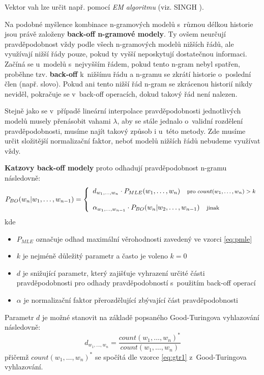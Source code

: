 \documentclass[12pt,a4paper]{report}
\begin{document}
Vektor vah lze určit např. pomocí \textit{EM algoritmu} (viz. SINGH \cite{emal}).

Na podobné myšlence kombinace n-gramových modelů s~různou délkou historie jsou právě založeny \textbf{back-off n-gramové modely}. Ty ovšem neurčují pravděpodobnost vždy podle všech n-gramových modelů nižších řádů, ale využívají nižší řády pouze, pokud ty vyšší neposkytují dostatečnou informaci. Začíná se u~modelů s~nejvyšším řádem, pokud tento n-gram nebyl spatřen, proběhne tzv. \textbf{back-off} k~nižšímu řádu a n-gramu se zkrátí historie o~poslední člen (např. slovo). Pokud ani tento nižší řád n-gram se zkrácenou historií nikdy neviděl, pokračuje se v~back-off operacích, dokud takový řád není nalezen.

Stejně jako se v~případě lineární interpolace pravděpodobnosti jednotlivých modelů musely přenásobit vahami $\lambda$, aby se stále jednalo o~validní rozdělení pravděpodobnosti, musíme najít takový způsob i u~této metody. Zde musíme určit složitější normalizační faktor, neboť modelů nižších řádů nebudeme využívat vždy.

\textbf{Katzovy back-off modely} proto odhadují pravděpodobnost n-gramu následovně:
\begin{equation}
P_{BO}(w_n|w_1, \ldots, w_{n-1}) = \left\{
\begin{array}{l}
d_{w_1, \ldots, w_n} \cdot P_{MLE}(w_1, \ldots, w_n) \quad \text{\footnotesize pro $count(w_1, \ldots, w_n) > k$} \\
\\
\alpha_{w_1, \ldots, w_{n-1}} \cdot P_{BO}(w_n|w_2, \ldots, w_{n-1}) \quad \text{\footnotesize jinak} 
\end{array}\right.
\end{equation}
kde \begin{itemize}
\item{$P_{MLE}$ označuje odhad maximální věrohodnosti zavedený ve vzorci \eqref{eq:pmle}}
\item{$k$ je nejméně důležitý parametr a často je voleno $k = 0$}
\item{$d$ je snižující parametr, který zajišťuje vyhrazení určité části pravděpodobnosti pro odhady pravděpodobností s~použitím back-off operací}
\item{$\alpha$ je normalizační faktor přerozdělující zbývající část pravděpodobnosti}
\end{itemize}

Parametr $d$ je možné stanovit na základě popsaného Good-Turingova vyhlazování následovně:
\begin{equation}
d_{w_1, \ldots, w_n} = \frac{count(w_1, \ldots, w_n)^*}{count(w_1, \ldots, w_n)}
\end{equation}
přičemž $count(w_1, \ldots, w_n)^*$ se spočítá dle vzorce \eqref{eq:gtr1} z~Good-Turingova vyhlazování.
\end{document}
